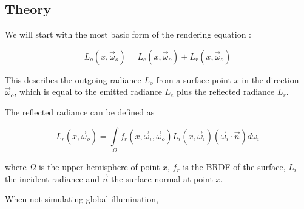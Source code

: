 
\subsection{Theory}


\newcommand{\dir}{\vec\omega} %

\newcommand{\outgoingDir}{ \dir_o}
\newcommand{\incidenceDir}{\dir_i}

\newcommand{\outgoingRadiance}{  L_o(x, \outgoingDir)}
\newcommand{\emittedRadiance}{   L_e(x, \outgoingDir)}
\newcommand{\reflectedRadiance}{ L_r(x, \outgoingDir)}
\newcommand{\incidentRadiance}{  L_i(x, \incidenceDir)}

\newcommand{\brdf}{f_r} %

\newcommand{\surfaceNormal}{\vec{n}}

We will start with the most basic form of the rendering equation \citep{Kajiya:1986:RenderingEquation}:

\begin{figure}[!htp]
  \begin{equation}
    \outgoingRadiance = \emittedRadiance + \reflectedRadiance
  \label{eq:renderBasic}
  \end{equation}
\end{figure}
\noindent
This describes the outgoing radiance $L_o$ from a surface point $x$ in the direction $\outgoingDir$, which is equal to the emitted radiance $L_e$ plus the reflected radiance $L_r$.

The reflected radiance can be defined as

\begin{figure}[!htp]
  \begin{equation}
    \reflectedRadiance = \int\limits_{\Omega} \brdf(x, \incidenceDir, \outgoingDir)\incidentRadiance (\incidenceDir \cdot \surfaceNormal) d \omega_i
  \label{eq:render}
  \end{equation}
\end{figure}
\noindent
where $\Omega$ is the upper hemisphere of point $x$, $\brdf$ is the BRDF of the surface, $L_i$ the incident radiance and $\surfaceNormal$ the surface normal at point $x$.

When not simulating global illumination,

